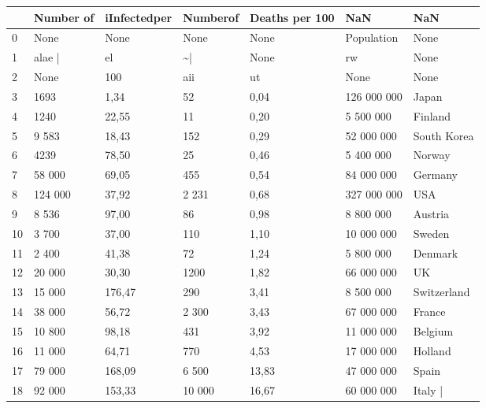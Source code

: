\begin{tabular}{lllllll}
\toprule
{} & Number of & iInfectedper & Numberof & Deaths per 100 &          NaN &          NaN \\
\midrule
0  &      None &         None &     None &           None &   Population &         None \\
1  &    alae | &           el &      \textasciitilde  | &           None &           rw &         None \\
2  &      None &          100 &      aii &             ut &         None &         None \\
3  &      1693 &         1,34 &       52 &           0,04 &  126 000 000 &        Japan \\
4  &      1240 &        22,55 &       11 &           0,20 &    5 500 000 &      Finland \\
5  &     9 583 &        18,43 &      152 &           0,29 &   52 000 000 &  South Korea \\
6  &      4239 &        78,50 &       25 &           0,46 &    5 400 000 &       Norway \\
7  &    58 000 &        69,05 &      455 &           0,54 &   84 000 000 &      Germany \\
8  &   124 000 &        37,92 &    2 231 &           0,68 &  327 000 000 &          USA \\
9  &     8 536 &        97,00 &       86 &           0,98 &    8 800 000 &      Austria \\
10 &     3 700 &        37,00 &      110 &           1,10 &   10 000 000 &       Sweden \\
11 &     2 400 &        41,38 &       72 &           1,24 &    5 800 000 &      Denmark \\
12 &    20 000 &        30,30 &     1200 &           1,82 &   66 000 000 &           UK \\
13 &    15 000 &       176,47 &      290 &           3,41 &    8 500 000 &  Switzerland \\
14 &    38 000 &        56,72 &    2 300 &           3,43 &   67 000 000 &       France \\
15 &    10 800 &        98,18 &      431 &           3,92 &   11 000 000 &      Belgium \\
16 &    11 000 &        64,71 &      770 &           4,53 &   17 000 000 &      Holland \\
17 &    79 000 &       168,09 &    6 500 &          13,83 &   47 000 000 &        Spain \\
18 &    92 000 &       153,33 &   10 000 &          16,67 &   60 000 000 &      Italy | \\
\bottomrule
\end{tabular}
